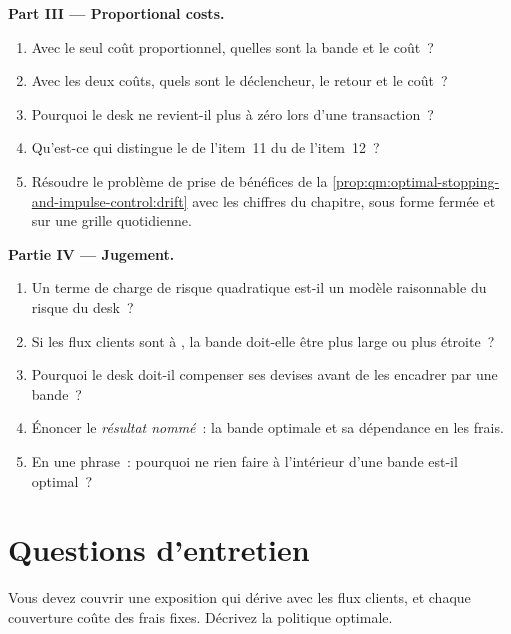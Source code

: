 \begin{problem}
\medskip\noindent\textbf{Part III --- Proportional costs.}
\begin{enumerate}[resume]
\item Avec le seul coût proportionnel, quelles sont la bande et le coût~?
\item Avec les deux coûts, quels sont le déclencheur, le retour et le coût~?
\item Pourquoi le desk ne revient-il plus à zéro lors d'une transaction~?
\item Qu'est-ce qui distingue le  de l'item~11 du  de l'item~12~?
\item Résoudre le problème de prise de bénéfices de la \cref{prop:qm:optimal-stopping-and-impulse-control:drift} avec les chiffres du chapitre, sous forme fermée et sur une grille quotidienne.
\end{enumerate}

\medskip\noindent\textbf{Partie IV --- Jugement.}
\begin{enumerate}[resume]
\item Un terme de charge de risque quadratique est-il un modèle raisonnable du risque du desk~?
\item Si les flux clients sont à , la bande doit-elle être plus large ou plus étroite~?
\item Pourquoi le desk doit-il compenser ses devises avant de les encadrer par une bande~?
\item Énoncer le \emph{résultat nommé}~: la bande optimale et sa dépendance en les frais.
\item En une phrase~: pourquoi ne rien faire à l'intérieur d'une bande est-il optimal~?
\end{enumerate}
\end{problem}

\section{Questions d'entretien}

\begin{interviewq}\label{iq:qm:optimal-stopping-and-impulse-control:1}
Vous devez couvrir une exposition qui dérive avec les flux clients, et chaque couverture coûte des frais fixes. Décrivez la politique optimale.
\end{interviewq}


